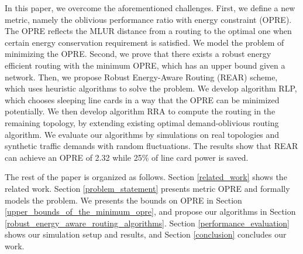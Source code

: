 \documentclass[conference]{IEEEtran}
\begin{document}
In this paper, we overcome the aforementioned challenges. First, we define a new metric, namely the oblivious performance ratio with energy constraint (OPRE). The OPRE reflects the MLUR distance from a routing to the optimal one when certain energy conservation requirement is satisfied. We model the problem of minimizing the OPRE. Second, we prove that there exists a robust energy efficient routing with the minimum OPRE, which has an upper bound given a network. Then, we propose Robust Energy-Aware Routing (REAR) scheme, which uses heuristic algorithms to solve the problem. We develop algorithm RLP, which chooses sleeping line cards in a way that the OPRE can be minimized potentially. We then develop algorithm RRA to compute the routing in the remaining topology, by extending existing optimal demand-oblivious routing algorithm. We evaluate our algorithms by simulations on real topologies and synthetic traffic demands with random fluctuations. The results show that REAR can achieve an OPRE of 2.32 while 25\% of line card power is saved.

The rest of the paper is organized as follows. Section \ref{related_work} shows the related work. Section \ref{problem_statement} presents metric OPRE and formally models the problem. We presents the bounds on OPRE in Section \ref{upper_bounds_of_the_minimum_opre}, and propose our algorithms in Section \ref{robust_energy_aware_routing_algorithms}. Section \ref{performance_evaluation} shows our simulation setup and results, and Section \ref{conclusion} concludes our work.
\end{document}
